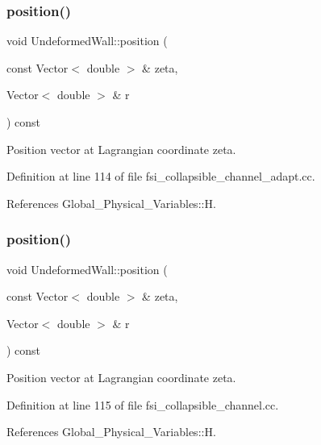 \subsubsection{\texorpdfstring{position()}{position()}\hspace{0.1cm}{\footnotesize\ttfamily [1/8]}}
{\footnotesize\ttfamily void Undeformed\+Wall\+::position (\begin{DoxyParamCaption}\item[{const Vector$<$ double $>$ \&}]{zeta,  }\item[{Vector$<$ double $>$ \&}]{r }\end{DoxyParamCaption}) const\hspace{0.3cm}{\ttfamily [inline]}}



Position vector at Lagrangian coordinate zeta. 



Definition at line 114 of file fsi\+\_\+collapsible\+\_\+channel\+\_\+adapt.\+cc.



References Global\+\_\+\+Physical\+\_\+\+Variables\+::H.

\mbox{\label{classUndeformedWall_ab0410681e2096091319a79e79937cba3}} 
\subsubsection{\texorpdfstring{position()}{position()}\hspace{0.1cm}{\footnotesize\ttfamily [2/8]}}
{\footnotesize\ttfamily void Undeformed\+Wall\+::position (\begin{DoxyParamCaption}\item[{const Vector$<$ double $>$ \&}]{zeta,  }\item[{Vector$<$ double $>$ \&}]{r }\end{DoxyParamCaption}) const\hspace{0.3cm}{\ttfamily [inline]}}



Position vector at Lagrangian coordinate zeta. 



Definition at line 115 of file fsi\+\_\+collapsible\+\_\+channel.\+cc.



References Global\+\_\+\+Physical\+\_\+\+Variables\+::H.

